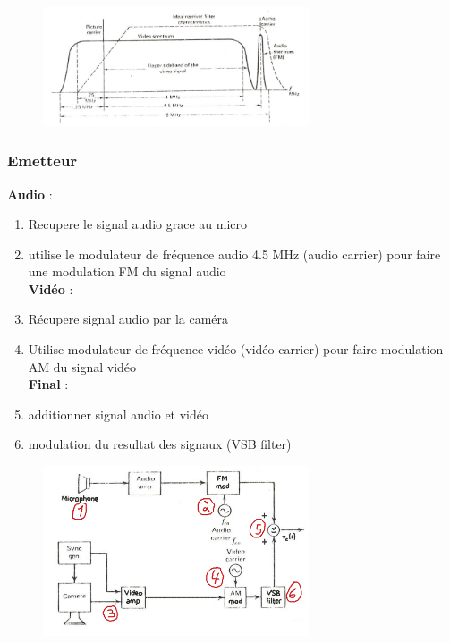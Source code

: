 				 \begin{figure}[htp]
				\centering
				\includegraphics[width=0.7\textwidth]{img/ModulationTVNoirBlanc.png}
				\end{figure}
			\subsubsection{Emetteur}
				\textbf{Audio} : 
				\begin{enumerate}
					\item Recupere le signal audio grace au micro
					\item utilise le modulateur de fréquence audio 4.5 MHz (audio carrier) pour faire une modulation FM du signal audio\\
					
				\textbf{Vidéo} : \\
					\item Récupere signal audio par la caméra
					\item Utilise modulateur de fréquence vidéo (vidéo carrier) pour faire modulation AM du signal vidéo\\
					
				\textbf{Final} :\\
				
				\item additionner signal audio et vidéo
				\item modulation du resultat des signaux (VSB filter)
				\end{enumerate}
				
				\begin{figure}[htp]
				\centering
				\includegraphics[width=0.7\textwidth]{img/EmetteruTVNoirBlanc.png}
				\end{figure}
				
